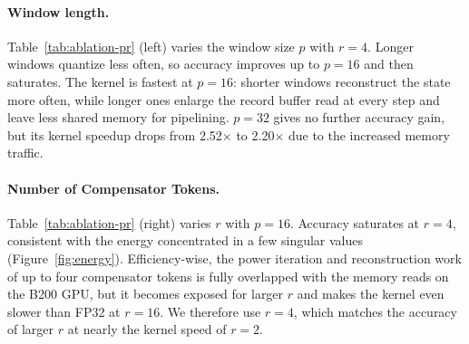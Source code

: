 \paragraph{Window length.}
Table~\ref{tab:ablation-pr} (left) varies the window size $p$ with $r=4$.
Longer windows quantize less often, so accuracy improves up to $p=16$ and then saturates.
The kernel is fastest at $p=16$: shorter windows reconstruct the state more often, while longer ones enlarge the record buffer read at every step and leave less shared memory for pipelining.
$p=32$ gives no further accuracy gain, but its kernel speedup drops from 2.52$\times$ to 2.20$\times$ due to the increased memory traffic.

\noindent\begin{minipage}{\linewidth}
\paragraph{Number of Compensator Tokens.}
Table~\ref{tab:ablation-pr} (right) varies $r$ with $p=16$.
Accuracy saturates at $r=4$, consistent with the energy concentrated in a few singular values (Figure~\ref{fig:energy}).
Efficiency-wise, the power iteration and reconstruction work of up to four compensator tokens is fully overlapped with the memory reads on the B200 GPU, but it becomes exposed for larger $r$ and makes the kernel even slower than FP32 at $r=16$.
We therefore use $r=4$, which matches the accuracy of larger $r$ at nearly the kernel speed of $r=2$.
\end{minipage}
